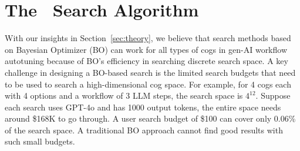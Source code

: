 \section{The \search\ Search Algorithm}
\label{sec:search}



With our insights in Section~\ref{sec:theory}, we believe that search methods based on Bayesian Optimizer (BO) can work for all types of cogs in gen-AI workflow autotuning because of BO's efficiency in searching discrete search space.
A key challenge in designing a BO-based search is the limited search budgets that need to be used to search a high-dimensional cog space. 
For example, for 4 cogs each with 4 options and a workflow of 3 LLM steps, the search space is $4^{12}$. Suppose each search uses GPT-4o and has 1000 output tokens, the entire space needs around \$168K to go through. A user search budget of \$100 can cover only 0.06\% of the search space. A traditional BO approach cannot find good results with such small budgets.

